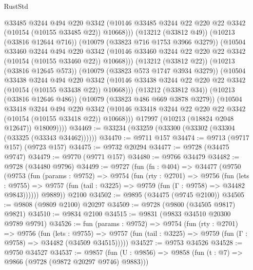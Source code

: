 \begin{lexlean}{RustStd}
\begin{coremodule}
{\begin{coremodule}
{{{{{{{{{{{{{{{{{{{{{{{{{{                      @33485
                      @3244
                      @494
                      @220
                      @3342
                      (@10146 @33485 @3244 @22 @220 @22 @3342 (@10154 (@10155 @33485 @22)) @10668)))
                  (@13212 (@33812 @49))
                  (@10213 (@33816 @12644 @716))
                  (@10079 (@33823 @716 @1753 @3966 @3279))
                  (@10504
                    @33460
                    @3244
                    @494
                    @220
                    @3342
                    (@10146 @33460 @3244 @22 @220 @22 @3342 (@10154 (@10155 @33460 @22)) @10668)))
                (@13212 (@33812 @22))
                (@10213 (@33816 @12645 @573))
                (@10079 (@33823 @573 @1747 @3934 @3279))
                (@10504
                  @33438
                  @3244
                  @494
                  @220
                  @3342
                  (@10146 @33438 @3244 @22 @220 @22 @3342 (@10154 (@10155 @33438 @22)) @10668)))
              (@13212 (@33812 @34))
              (@10213 (@33816 @12646 @486))
              (@10079 (@33823 @486 @669 @3878 @3279))
              (@10504
                @33418
                @3244
                @494
                @220
                @3342
                (@10146 @33418 @3244 @22 @220 @22 @3342 (@10154 (@10155 @33418 @22)) @10668)))
            @17997
            (@10213 (@18824 @2048 @12647))
            @18009))))
@34469 := @33234 (@33259 (@33300 (@33302 (@33304 (@33325 (@33343 @34462))))))
@34470 := @9711 @157
@34474 := @9713 (@9717 @157) (@9723 @157)
@34475 := @9732 @20294
@34477 := @9728 (@34475 @9747)
@34479 := @9770 (@9771 @157)
@34480 := @9766 @34479
@34482 := @9728 (@34480 @9796)
@34499 := @9727
    (fun (fn : @404) =>
    @34477
      (@9750
        (@9753
          (fun (params : @9752) =>
          @9754
            (fun (rty : @2701) =>
            @9756
              (fun (lets : @9755) =>
              @9757 (fun (tail : @3225) => @9759 (fun (Γ : @9758) => @34482 @9843))))))
        @9889))
    @2100
@34502 := @9895 (@34475 (@9745 @2100))
@34505 := @9808 (@9809 @2100) @20297
@34509 := @9728 (@9800 (@34505 @9817) @9821)
@34510 := @9834 @2100
@34515 := @9831 (@9833 @34510 @20300 @9789 @9791)
@34526 := fun (params : @9752) =>
  @9754
    (fun (rty : @2701) =>
    @9756
      (fun (lets : @9755) =>
      @9757 (fun (tail : @3225) => @9759 (fun (Γ : @9758) => @34482 (@34509 @34515)))))
@34527 := @9753 @34526
@34528 := @9750 @34527
@34537 := @9857
    (fun (U : @9856) => @9858 (fun (t : @7) => @9866 (@9728 (@9872 @20297 @9746) @9883)))
}}}}}}}}}}}}}}}}}}}}}}}}}}
\end{coremodule}}
\end{coremodule}
\end{lexlean}
